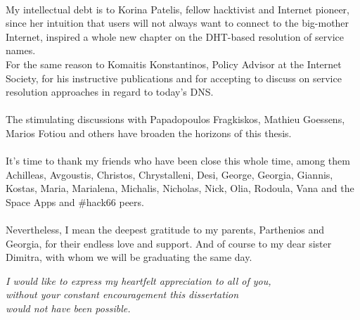 \paragraph{}
My intellectual debt is to Korina Patelis, fellow hacktivist and Internet pioneer, since her intuition that users will not always want to connect to the big-mother Internet, inspired a whole new chapter on the DHT-based resolution of service names.\\
\indent For the same reason to Komaitis Konstantinos, Policy Advisor at the Internet Society, for his instructive publications and for accepting to discuss on service resolution approaches in regard to today's DNS.

\paragraph{}
The stimulating discussions with Papadopoulos Fragkiskos, Mathieu Goessens, Marios Fotiou and others have broaden the horizons of this thesis.

\paragraph{}
It's time to thank my friends who have been close this whole time, among them Achilleas, Avgoustis, Christos, Chrystalleni, Desi, George, Georgia, Giannis, Kostas, Maria, Marialena, Michalis, Nicholas, Nick, Olia, Rodoula, Vana and the Space Apps and \#hack66 peers.

\paragraph{}
Nevertheless, I mean the deepest gratitude to my parents, Parthenios and Georgia, for their endless love and support. And of course to my dear sister Dimitra, with whom we will be graduating the same day.\\[0.8cm]


\begin{flushright}
\emph{I would like to express my heartfelt appreciation to all of you,\\
without your constant encouragement this dissertation\\
would not have been possible.}
\end{flushright}